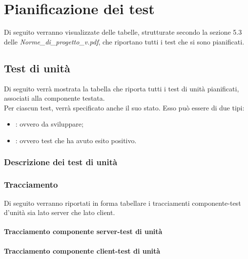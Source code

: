 \newpage
\section{Pianificazione dei test}
Di seguito verranno visualizzate delle tabelle, strutturate secondo la sezione 5.3 delle  \emph{Norme\_di\_progetto\_v\versioneNormeDiProgetto{}.pdf}, che riportano tutti i test che si sono pianificati. \\


\subsection{Test di unità}
Di seguito verrà mostrata la tabella che riporta tutti i test di unità pianificati, associati alla componente testata.\\
Per ciascun test, verrà specificato anche il suo stato. Esso può essere di due tipi:
\begin{itemize}
\item {}: ovvero da sviluppare;
\item {}: ovvero test che ha avuto esito positivo.
\end{itemize}
\subsubsection{Descrizione dei test di unità}




\subsubsection{Tracciamento}
Di seguito verranno riportati in forma tabellare i tracciamenti componente-test d'unità sia lato server che lato client.\\


\paragraph{Tracciamento componente server-test di unità}


\paragraph{Tracciamento componente client-test di unità}


